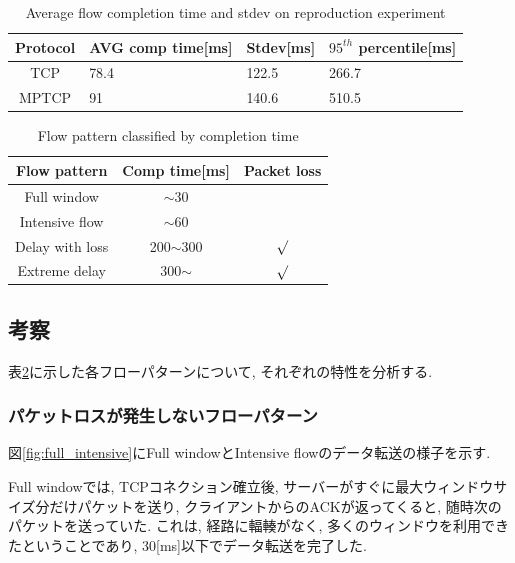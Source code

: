 \documentclass[10pt, a4paper, twocolumn]{jsarticle}
\begin{document}
\begin{table}[h]
\begin{center}
\footnotesize
\begin{tabular}{c|p{5em}|p{4em}|p{5em}}
\hline
Protocol & AVG comp time[ms]& Stdev[ms] &
$95^{th}$ percentile[ms]\\
\hline \hline TCP &\hfil 78.4 &\hfil 122.5 &\hfil 266.7\\
MPTCP &\hfil 91 &\hfil 140.6 &\hfil 510.5\\
\hline
\end{tabular}
\caption{Average flow completion time and stdev on reproduction experiment}
\label{table:short_flow_rep}
\end{center}
\end{table}

\begin{table}[h]
\begin{center}
\footnotesize
\begin{tabular}{c|c|c}
\hline
Flow pattern & Comp time[ms] & Packet loss \\ \hline \hline
Full window & $\sim$30 & \\
Intensive flow & $\sim$60 & \\
Delay with loss & 200$\sim$300 & $\surd$\\
Extreme delay & 300$\sim$ & $\surd$\\
\hline
\end{tabular}
\caption{Flow pattern classified by completion time}
\label{table:flow_pattern}
\end{center}
\end{table}

\subsection{考察}
表\ref{table:flow_pattern}に示した各フローパターンについて, それぞれの特性を分析する.

\subsubsection{パケットロスが発生しないフローパターン}
図\ref{fig:full_intensive}にFull windowとIntensive flowのデータ転送の様子を示す.

Full windowでは, TCPコネクション確立後, サーバーがすぐに最大ウィンドウサイズ分だけパケットを送り,
クライアントからのACKが返ってくると, 随時次のパケットを送っていた.
これは, 経路に輻輳がなく, 多くのウィンドウを利用できたということであり, 30[ms]以下でデータ転送を完了した.
\end{document}
